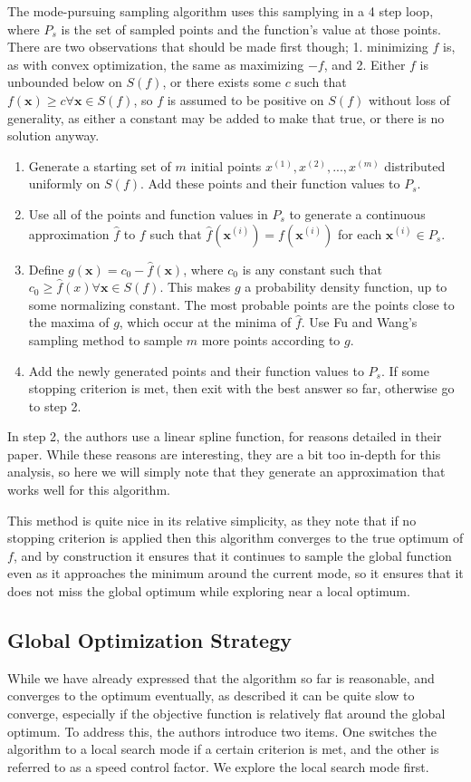 \documentclass[10pt]{article}
\renewcommand{\vec}[1]{\mathbf{#1}}
\newcommand{\x}{\vec{x}}
\begin{document}
	The mode-pursuing sampling algorithm uses this samplying in a 4 step loop, where $P_s$ is the set of sampled points and the function's value at those points. There are two observations that should be made first though; 1. minimizing $f$ is, as with convex optimization, the same as maximizing $-f$, and 2. Either $f$ is unbounded below on $S(f)$, or there exists some $c$ such that $f(\x)\geq c\forall\x\in S(f)$, so $f$ is assumed to be positive on $S(f)$ without loss of generality, as either a constant may be added to make that true, or there is no solution anyway.
	\begin{enumerate}
		\item Generate a starting set of $m$ initial points $x^{(1)},x^{(2)},...,x^{(m)}$ distributed uniformly on $S(f)$. Add these points and their function values to $P_s$.
		\item Use all of the points and function values in $P_s$ to generate a continuous approximation $\hat{f}$ to $f$ such that $\hat{f}(\x^(i)) = f(\x^{(i)})$ for each $\x^{(i)}\in P_s$.
		\item Define $g(\x) = c_0 - \hat{f}(\x)$, where $c_0$ is any constant such that $c_0 \geq \hat{f}(x)\forall\x\in S(f)$. This makes $g$ a probability density function, up to some normalizing constant. The most probable points are the points close to the maxima of $g$, which occur at the minima of $\hat{f}$. Use Fu and Wang's sampling method to sample $m$ more points according to $g$.
		\item Add the newly generated points and their function values to $P_s$. If some stopping criterion is met, then exit with the best answer so far, otherwise go to step 2.
	\end{enumerate}
	In step 2, the authors use a linear spline function, for reasons detailed in their paper. While these reasons are interesting, they are a bit too in-depth for this analysis, so here we will simply note that they generate an approximation that works well for this algorithm.
	
	This method is quite nice in its relative simplicity, as they note that if no stopping criterion is applied then this algorithm converges to the true optimum of $f$, and by construction it ensures that it continues to sample the global function even as it approaches the minimum around the current mode, so it ensures that it does not miss the global optimum while exploring near a local optimum.
	
\subsection{Global Optimization Strategy}
	While we have already expressed that the algorithm so far is reasonable, and converges to the optimum eventually, as described it can be quite slow to converge, especially if the objective function is relatively flat around the global optimum. To address this, the authors introduce two items. One switches the algorithm to a local search mode if a certain criterion is met, and the other is referred to as a speed control factor. We explore the local search mode first.
	
\end{document}

